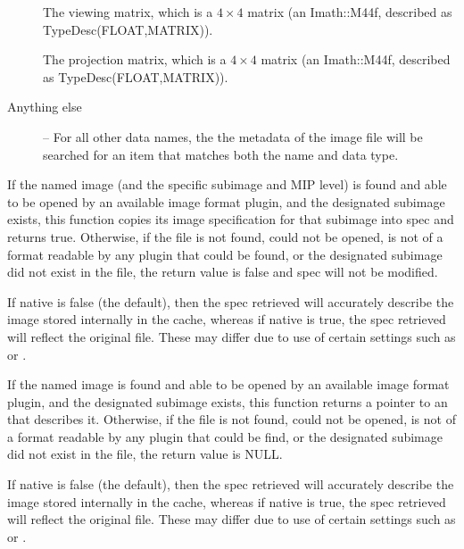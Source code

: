 \begin{description}
\item[\rm {}] The viewing matrix, which is a
$4 \times 4$ matrix (an {\cf Imath::M44f}, described as {\cf
  TypeDesc(FLOAT,MATRIX)}).

\item[\rm {}] The projection matrix, which is a
$4 \times 4$ matrix (an {\cf Imath::M44f}, described as {\cf
  TypeDesc(FLOAT,MATRIX)}).

\item[Anything else] -- For all other data names, the
the metadata of the image file will be searched for an item that
matches both the name and data type.

\end{description}
\apiend


If the named image (and the specific subimage and MIP level) is found and able to be opened by an available
image format plugin, and the designated subimage exists, this function copies
its image specification for that subimage into {\cf spec} and returns
{\cf true}.  Otherwise, if the file is not found, could not be opened,
is not of a format readable by any plugin that could be found, or
the designated subimage did not exist in the file, the return value is
{\cf false} and {\cf spec} will not be modified.

If {\cf native} is {\cf false} (the default), then the spec retrieved
will accurately describe the image stored internally in the cache,
whereas if {\cf native} is {\cf true}, the spec retrieved will reflect
the original file.  These may differ due to use of certain \ImageCache
settings such as  or .

\apiend


If the named image is found and able to be opened by an available
image format plugin, and the designated subimage exists, this function
returns a pointer to an \ImageSpec that describes it.  Otherwise, if the
file is not found, could not be opened, is not of a format readable by
any plugin that could be find, or the designated subimage did
not exist in the file, the return value is NULL.

If {\cf native} is {\cf false} (the default), then the spec retrieved
will accurately describe the image stored internally in the cache,
whereas if {\cf native} is {\cf true}, the spec retrieved will reflect
the original file.  These may differ due to use of certain \ImageCache
settings such as  or .

